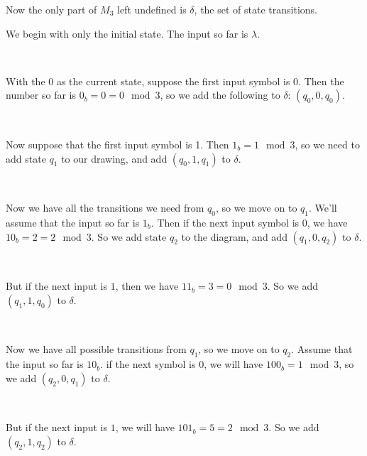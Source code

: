 \documentclass{bcthesis}
\newlength{\oddsidemarginORIG}
\newenvironment{exstep}[1]
	{
		\setlength{\oddsidemarginORIG}{\oddsidemargin}
		\setlength{\oddsidemargin}{20 pt}
		\begin{minipage}{0.5 \textwidth}
			#1
		\end{minipage} \begin{minipage}{0.5 \textwidth}
	}
	{
		\end{minipage}\\[0.5 em]
		\setlength{\oddsidemargin}{\oddsidemarginORIG}
	}
\begin{document}
		Now the only part of $M_3$ left undefined is $\delta$, the set of state transitions.

			\begin{exstep}
				{
					We begin with only the initial state.
					The input so far is $\lambda$.
				}
				
			\end{exstep}

			\begin{exstep}
				{
					With the 0 as the current state, suppose the first input symbol is 0. 
					Then the number so far is $0_b = 0 = 0 \mod 3$, so we add the following to $\delta$: $(q_0, 0, q_0)$.
				}
				
			\end{exstep}

			\begin{exstep}
				{
					Now suppose that the first input symbol is 1. 
					Then $1_b = 1 \mod 3$, so we need to add state $q_1$ to our drawing, and add $(q_0, 1, q_1)$ to $\delta$.
				}
				
			\end{exstep}

			\begin{exstep}
				{
					Now we have all the transitions we need from $q_0$, so we move on to $q_1$.
					We'll assume that the input so far is $1_b$.
					Then if the next input symbol is $0$, we have $10_b = 2 = 2 \mod 3$.
					So we add state $q_2$ to the diagram, and add $(q_1, 0, q_2)$ to $\delta$.
				}
				
			\end{exstep}

			\begin{exstep}
				{
					But if the next input is $1$, then we have $11_b = 3 = 0 \mod 3$.
					So we add $(q_1, 1, q_0)$ to $\delta$.
				}
				
			\end{exstep}
			

			\begin{exstep}
				{
				Now we have all possible transitions from $q_1$, so we move on to $q_2$.
				Assume that the input so far is $10_b$.
				if the next symbol is $0$, we will have $100_b = 1 \mod 3$, so we add $(q_2, 0, q_1)$ to $\delta$.
				}
				
			\end{exstep}
			
			\begin{exstep}
				{
					But if the next input is $1$, we will have $101_b = 5 = 2 \mod 3$.
					So we add $(q_2, 1, q_2)$ to $\delta$.
				}
				
			\end{exstep}
\end{document}
